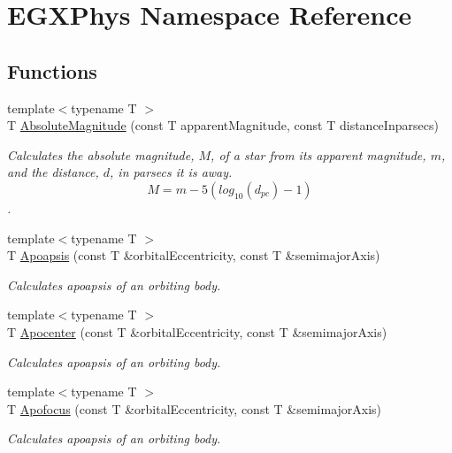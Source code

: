 \hypertarget{namespace_e_g_x_phys}{}\section{E\+G\+X\+Phys Namespace Reference}
\label{namespace_e_g_x_phys}
\subsection*{Functions}
\begin{DoxyCompactItemize}
\item 
{\footnotesize template$<$typename T $>$ }\\T \mbox{\hyperlink{group___e_g_x_phys-_astrophysics-_absolute_magnitude_ga2ddb255fa28972334d82f377ce182048}{Absolute\+Magnitude}} (const T apparent\+Magnitude, const T distance\+Inparsecs)
\begin{DoxyCompactList}\small\item\em Calculates the absolute magnitude, $M$, of a star from its apparent magnitude, $m$, and the distance, $d$, in parsecs it is away. \[M= m - 5 \left ( log_{10}(d_{pc}) - 1 \right )\]. \end{DoxyCompactList}\item 
{\footnotesize template$<$typename T $>$ }\\T \mbox{\hyperlink{group___e_g_x_phys-_apoapsis_gaf962e650bf84a568458e8eb39b1c61ba}{Apoapsis}} (const T \&orbital\+Eccentricity, const T \&semimajor\+Axis)
\begin{DoxyCompactList}\small\item\em Calculates apoapsis of an orbiting body. \end{DoxyCompactList}\item 
{\footnotesize template$<$typename T $>$ }\\T \mbox{\hyperlink{group___e_g_x_phys-_apoapsis_ga5e51a53e2f974264bada34f159fdc948}{Apocenter}} (const T \&orbital\+Eccentricity, const T \&semimajor\+Axis)
\begin{DoxyCompactList}\small\item\em Calculates apoapsis of an orbiting body. \end{DoxyCompactList}\item 
{\footnotesize template$<$typename T $>$ }\\T \mbox{\hyperlink{group___e_g_x_phys-_apoapsis_gaa53ac4e15bc6bc0fecf72eadb7a513e0}{Apofocus}} (const T \&orbital\+Eccentricity, const T \&semimajor\+Axis)
\begin{DoxyCompactList}\small\item\em Calculates apoapsis of an orbiting body. \end{DoxyCompactList}\item 

\end{DoxyCompactItemize}
